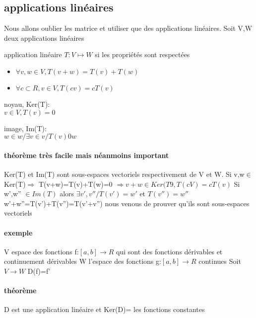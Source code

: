 \documentclass[a4paper,10pt]{article}
\begin{document}
\subsection{applications linéaires}
Nous allons oublier les matrice et utiliser que des applications linéaires.
\newline
Soit V,W deux applications linéaires
\begin{description}
 \item application linéaire $T:V\mapsto W$ si les propriétés sont respectées
\end{description}
\begin{itemize}
 \item $\forall v,w\in V, T(v+w)= T(v)+T(w)$
 \item $\forall c \subset R, v\in V, T(cv)=cT(v)$
\end{itemize}
\begin{description}
 \item noyau, Ker(T):\\{$v\in V, T(v)=0$}
 \item image, Im(T):\\{$w\in w/\exists v\in v / T(v)0w$}
\end{description}
\paragraph{théorème très facile mais néanmoins  important}
Ker(T) et Im(T) sont sous-espaces vectoriels respectivement de V et W.
\newline
Si v,w$\in$Ker(T)$\Rightarrow$ T(v+w)=T(v)+T(w)=0
\newline
$\Rightarrow v+w\in Ker(T9,T(cV)=cT(v)$
\newline
Si w',w'' $\in Im(T)$ alors $\exists v',v'' /T(v')=w'$ et $T(v'')=w''$
\newline
w'+w''=T(v')+T(v'')=T(v'+v'')
\newline
nous venous de prouver qu'ils sont sous-espaces vectoriels
\paragraph{exemple}
V espace des fonctions f:$[a,b]\rightarrow R$ qui sont des fonctions dérivables et continuement dérivables
\newline
W l'espace des fonctions g:$[a,b]\rightarrow R$ continues
\newline
Soit $V\rightarrow W$ D(f)=f'
\paragraph{théorème}
D est une application linéaire et Ker(D)= les fonctions constantes
\end{document}
